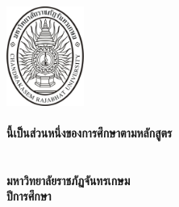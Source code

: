 \makeatletter
\clearpage\pagestyle{empty}
	{\centering
	\fontsize{16}{18.4}\selectfont
		\includegraphics[width=1in]{CRU_LOGO/CRU_Chandra}\\\vspace{\baselineskip}
		\bfseries\@thesistitleThai\\
		\bfseries\@thesistitle
	\vfill
	\fontsize{14}{16.1}\selectfont 
	\vspace{1.427465\baselineskip}
	\@authorThai
	\vfill
	 \@typeofwritingThai นี้เป็นส่วนหนึ่งของการศึกษาตามหลักสูตร\\
	\@degreeThai\\
	\ifdefined\@majorThai \@majorThai \ifdefined\@departmentThai\space\fi\fi \ifdefined\@departmentThai \@departmentThai\\ \fi
	\@facultyThai\space มหาวิทยาลัยราชภัฏจันทรเกษม\\
	ปีการศึกษา \the\year
	\par}


\cleardoublepage
\newpage


